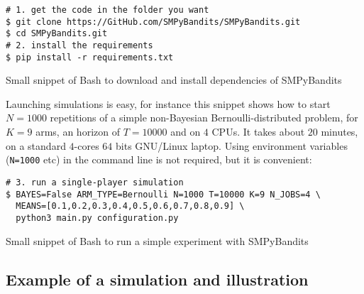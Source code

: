 \begin{small}
    \begin{listing}[h!]
        \begin{verbatim}
# 1. get the code in the folder you want
$ git clone https://GitHub.com/SMPyBandits/SMPyBandits.git
$ cd SMPyBandits.git
# 2. install the requirements
$ pip install -r requirements.txt
        \end{verbatim}
        \caption{Small snippet of Bash to download and install dependencies of SMPyBandits}
        \label{lst:3:howToInstallLibrary}
    \end{listing}
\end{small}

Launching simulations is easy, for instance this snippet shows how to start $N=1000$ repetitions of a simple non-Bayesian Bernoulli-distributed problem, for $K=9$ arms, an horizon of $T=10000$ and on $4$ CPUs.
It takes about $20$ minutes, on a standard $4$-cores $64$ bits GNU/Linux laptop.
Using environment variables (\texttt{N=1000} etc) in the command line is not required, but it is convenient:

\begin{small}
\begin{listing}[h!]
    \begin{verbatim}
# 3. run a single-player simulation
$ BAYES=False ARM_TYPE=Bernoulli N=1000 T=10000 K=9 N_JOBS=4 \
  MEANS=[0.1,0.2,0.3,0.4,0.5,0.6,0.7,0.8,0.9] \
  python3 main.py configuration.py
    \end{verbatim}
    \caption{Small snippet of Bash to run a simple experiment with SMPyBandits}
    \label{lst:3:howToRunBasicLibrary}
\end{listing}
\end{small}


\subsection{Example of a simulation and illustration}

